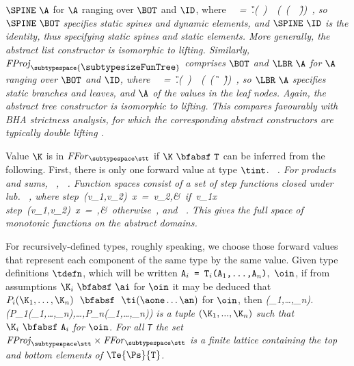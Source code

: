 \documentclass[11pt]{article}
\begin{document}
$\SPINE~\A$ for $\A$ ranging over $\BOT$ and $\ID$, where
\beqs
\it \SPINE\ \A\ =\ \mu\G.(\ \ID)\ \glb\ (\ (\A\ \x\ \G))\ ,
\eeqs
so $\SPINE\ \BOT$ specifies static spines and dynamic elements, and
$\SPINE\ \ID$ is the identity, thus specifying static spines and
static elements.  More generally, the abstract list
constructor is isomorphic to lifting.  Similarly,
${\it{}FProj}_{\subtypespace{\makebox{\subtypesize\tt FunTree}} }$
comprises $\BOT$ and $\LBR\ \A$ for $\A$ ranging over $\BOT$ and $\ID$, where
\beqs
\it \LBR\ \A\ =\ \mu\G.(\ \A)\ \glb\ (\ (\G\ \x\ \G))\ ,
\eeqs
so $\LBR\ \A$ specifies static branches and leaves, and $\A$ of the
values in the leaf nodes.  Again, the abstract tree constructor is
isomorphic to lifting.  This compares favourably with BHA strictness
analysis, for which the corresponding abstract constructors are
typically {\it double\/} lifting \cite{Wad87,Sew93}.


Value $\K$ is in ${\it{}FFor}_{\subtypespace\stt}$ if $\K~\bfabsf~\mbox{\tt T}$ can be
inferred from the following.
First, there is only one forward value at type $\tint$.
\beqs
\it \axm{()\ {}\ \bfabsf\ {}\ \tint}\ .
\eeqs
For products and sums,
\beqs
\it {}\ ,
\eeqs
\beqs
\it {}\ .
\eeqs
Function spaces consist of a set of step functions closed under lub.
\beqs
\it {}\ ,
\eeqs
where
\beqs
\it step\ (v_{\rm1},v_{\rm2})\ x\ =\ v_{\rm2},&\it {\rm\ if}\ v_{\rm1}\we{}x\\
\it step\ (v_{\rm1},v_{\rm2})\ x\ =\ \bot,&\it {\rm\ otherwise}\ ,
\eeqs
and
\beqs
\it {}\ .
\eeqs
This gives the full space of monotonic functions on the abstract
domains.

For recursively-defined types, roughly speaking, we choose those
forward values that represent each component of the same type by the
same value.  Given type definitions $\tdefn$, which will be written
$\mbox{\tt A}_i\mbox{\tt \ =\ T}_i\mbox{\tt (A}_1\mbox{\tt ,...,A}_n\mbox{\tt )},\ \oin$, if from assumptions
$\K_i~\bfabsf~\ai$ for $\oin$ it may be deduced that
$P_i(\K_1,\ldots,\K_n)~~\bfabsf~~\ti(\aone\ldots\an)$ for $\oin$, then
\beqs
\it \mu(\K_{\rm1},\ldots ,\K_n).(P_{\rm1}(\K_{\rm1},\ldots ,\K_n),\ldots ,P_n(\K_{\rm1},\ldots ,\K_n))
\eeqs
is a tuple $(\K_1,...,\K_n)$ such that $\K_i\ \bfabsf\ \mbox{\tt A}_i$
for $\oin$.
For all \mbox{\tt T} the set ${\it{}FProj}_{\subtypespace\stt}\times{\it{}FFor}_{\subtypespace\stt}$ is a 
finite lattice containing the top and bottom elements of $\Te{\Ps}{\mbox{\tt T}}$.
\end{document}
